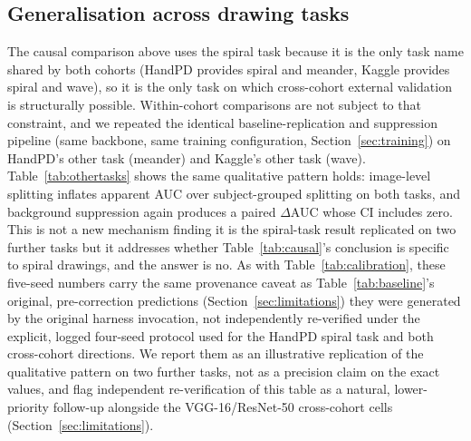 \documentclass[3p,final,10pt]{elsarticle}
\let\oldsubsection\subsection
\renewcommand{\subsection}{\FloatBarrier\oldsubsection}
\begin{document}
\subsection{Generalisation across drawing tasks}
\label{sec:othertasks}
The causal comparison above uses the spiral task because it is the only
task name shared by both cohorts (HandPD provides spiral and meander,
Kaggle provides spiral and wave), so it is the only task on which
cross-cohort external validation is structurally possible. Within-cohort
comparisons are not subject to that constraint, and we repeated the
identical baseline-replication and suppression pipeline (same backbone,
same training configuration, Section~\ref{sec:training}) on HandPD's
other task (meander) and Kaggle's other task (wave). Table~\ref{tab:othertasks}
shows the same qualitative pattern holds: image-level splitting inflates
apparent AUC over subject-grouped splitting on both tasks, and background
suppression again produces a paired $\Delta$AUC whose CI includes zero.
This is not a new mechanism finding it is the spiral-task result
replicated on two further tasks but it addresses whether Table~\ref{tab:causal}'s
conclusion is specific to spiral drawings, and the answer is no. As with
Table~\ref{tab:calibration}, these five-seed numbers carry the same
provenance caveat as Table~\ref{tab:baseline}'s original, pre-correction
predictions (Section~\ref{sec:limitations}) they were generated by the
original harness invocation, not independently re-verified under the
explicit, logged four-seed protocol used for the HandPD spiral task and
both cross-cohort directions. We report them as an illustrative
replication of the qualitative pattern on two further tasks, not as a
precision claim on the exact values, and flag independent re-verification
of this table as a natural, lower-priority follow-up alongside the
VGG-16/ResNet-50 cross-cohort cells (Section~\ref{sec:limitations}).

\begin{table}[H]
\centering
\caption{Within-cohort generalisation to HandPD meander and Kaggle wave,
EfficientNet-B0 (five seeds).}
\label{tab:othertasks}
\end{table}
\end{document}
